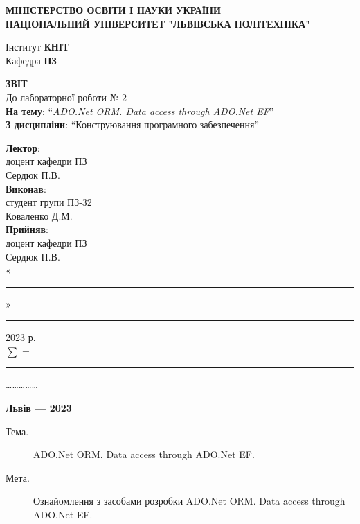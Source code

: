 \documentclass[14pt]{extreport}
\newcommand\subject{Конструювання програмного забезпечення}
\newcommand\lecturer{доцент кафедри ПЗ\\Сердюк П.В.}
\newcommand\teacher{доцент кафедри ПЗ\\Сердюк П.В.}
\newcommand\mygroup{ПЗ-32}
\newcommand\lab{2}
\newcommand\theme{ADO.Net ORM. Data access through ADO.Net EF}
\newcommand\purpose{Ознайомлення з засобами розробки ADO.Net ORM. Data access through ADO.Net EF}
\begin{document}
\begin{normalsize}
	\begin{titlepage}
		\thispagestyle{empty}
		\begin{center}
			\textbf{МІНІСТЕРСТВО ОСВІТИ І НАУКИ УКРАЇНИ\\
				НАЦІОНАЛЬНИЙ УНІВЕРСИТЕТ "ЛЬВІВСЬКА ПОЛІТЕХНІКА"}
		\end{center}
		\begin{flushright}
			Інститут \textbf{КНІТ}\\
			Кафедра \textbf{ПЗ}
		\end{flushright}
		\vspace{200pt}
		\begin{center}
			\textbf{ЗВІТ}\\
			\vspace{10pt}
			До лабораторної роботи № \lab\\
			\textbf{На тему}: “\textit{\theme}”\\
			\textbf{З дисципліни}: “\subject”
		\end{center}
		\vspace{40pt}
		\begin{flushright}
			
			\textbf{Лектор}:\\
			\lecturer\\
			\vspace{10pt}
			\textbf{Виконав}:\\
			
			студент групи \mygroup\\
			Коваленко Д.М.\\
			\vspace{10pt}
			\textbf{Прийняв}:\\
			
			\teacher\\
			
			\vspace{28pt}
			«\rule{1cm}{0.15mm}» \rule{1.5cm}{0.15mm} 2023 р.\\
			$\sum$ = \rule{1cm}{0.15mm}……………\\
			
		\end{flushright}
		\vspace{\fill}
		\begin{center}
			\textbf{Львів — 2023}
		\end{center}
	\end{titlepage}
		
	\begin{description}
		\item[Тема.] \theme.
		\item[Мета.] \purpose.
	\end{description}


\end{normalsize}
\end{document}
